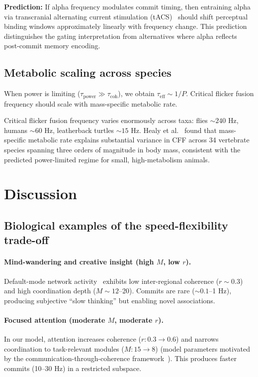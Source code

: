 \documentclass[12pt]{article}
\begin{document}
\textbf{Prediction:} If alpha frequency modulates commit timing, then entraining alpha via transcranial alternating current stimulation (tACS)~\cite{helfrich2014} should shift perceptual binding windows approximately linearly with frequency change. This prediction distinguishes the gating interpretation from alternatives where alpha reflects post-commit memory encoding.

\subsection{Metabolic scaling across species}

When power is limiting ($\tau_{\mathrm{power}} \gg \tau_{\mathrm{coh}}$), we obtain $\tau_{\mathrm{eff}} \sim 1/P$. Critical flicker fusion frequency should scale with mass-specific metabolic rate.

Critical flicker fusion frequency varies enormously across taxa: flies $\sim 240$ Hz, humans $\sim 60$ Hz, leatherback turtles $\sim 15$ Hz. Healy et al.~\cite{healy2013} found that mass-specific metabolic rate explains substantial variance in CFF across 34 vertebrate species spanning three orders of magnitude in body mass, consistent with the predicted power-limited regime for small, high-metabolism animals.

\section{Discussion}

\subsection{Biological examples of the speed-flexibility trade-off}

\paragraph{Mind-wandering and creative insight (high $M$, low $r$).}
Default-mode network activity~\cite{raichle2001} exhibits low inter-regional coherence ($r \sim 0.3$) and high coordination depth ($M \sim 12$--20). Commits are rare ($\sim 0.1$--1 Hz), producing subjective ``slow thinking'' but enabling novel associations.

\paragraph{Focused attention (moderate $M$, moderate $r$).}
In our model, attention increases coherence ($r: 0.3 \to 0.6$) and narrows coordination to task-relevant modules ($M: 15 \to 8$) (model parameters motivated by the communication-through-coherence framework~\cite{fries2015}). This produces faster commits (10--30 Hz) in a restricted subspace.
\end{document}

